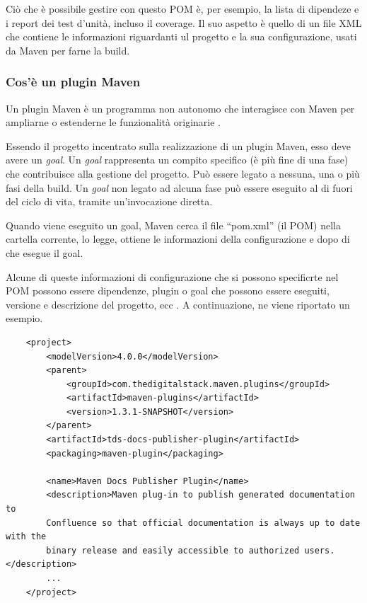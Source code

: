
    Ciò che è possibile gestire con questo POM è, per esempio, la lista di dipendeze e i report dei test d'unità, incluso il coverage.
    Il suo aspetto è quello di un file XML che contiene le informazioni riguardanti ul progetto e la sua configurazione, usati da Maven per farne la build.

    \subsubsection{Cos'è un plugin Maven}

    Un plugin Maven è un programma non autonomo che interagisce con Maven per ampliarne o estenderne le funzionalità originarie \cite{site:maven-plugin}.

    Essendo il progetto incentrato sulla realizzazione di un plugin Maven, esso deve avere un \emph{goal}.
    Un \emph{goal} rappresenta un compito specifico (è più fine di una fase) che contribuisce alla gestione del progetto.
    Può essere legato a nessuna, una o più fasi della build.
    Un \emph{goal} non legato ad alcuna fase può essere eseguito al di fuori del ciclo di vita, tramite un'invocazione diretta.


    Quando viene eseguito un goal, Maven cerca il file ``pom.xml'' (il POM) nella cartella corrente, lo legge, ottiene le informazioni della configurazione e dopo di che esegue il goal.

    Alcune di queste informazioni di configurazione che si possono specificrte nel POM possono essere dipendenze, plugin o goal che possono essere eseguiti, versione e descrizione del progetto, ecc \cite{site:maven-pom}.
    A continuazione, ne viene riportato un esempio.


    \begin{lstlisting} 
    <project>
        <modelVersion>4.0.0</modelVersion>
        <parent>
            <groupId>com.thedigitalstack.maven.plugins</groupId>
            <artifactId>maven-plugins</artifactId>
            <version>1.3.1-SNAPSHOT</version>
        </parent>
        <artifactId>tds-docs-publisher-plugin</artifactId>
        <packaging>maven-plugin</packaging>

        <name>Maven Docs Publisher Plugin</name>
        <description>Maven plug-in to publish generated documentation to 
        Confluence so that official documentation is always up to date with the 
        binary release and easily accessible to authorized users.</description>
        ...
    </project>  
    \end{lstlisting}
    

